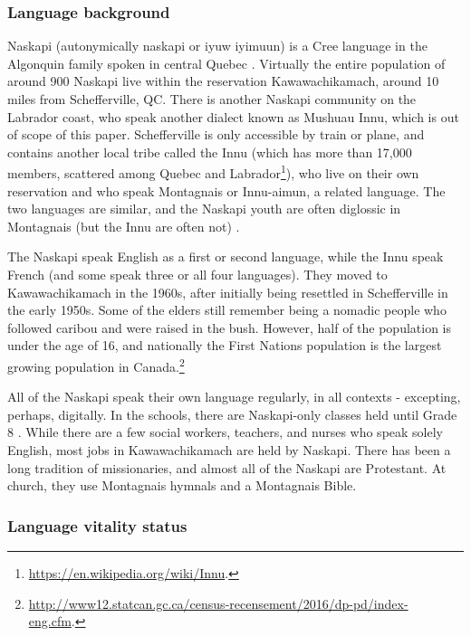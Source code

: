 \subsubsection{Language background}
\label{sec:naskapi-language-background}

Naskapi (autonymically  naskapi or  iyuw iyimuun) is a Cree language in the Algonquin family spoken in central Quebec \citep{MacKenzie-and-Jancewicz-1994}. Virtually the entire population of around 900 Naskapi live within the reservation Kawawachikamach, around 10 miles from Schefferville, QC. There is another Naskapi community on the Labrador coast, who speak another dialect known as Mushuau Innu, which is out of scope of this paper. Schefferville is only accessible by train or plane, and contains another local tribe called the Innu (which has more than 17,000 members, scattered among Quebec and Labrador\footnote{\href{https://en.wikipedia.org/wiki/Innu}{https://en.wikipedia.org/wiki/Innu}. }), who live on their own reservation and who speak Montagnais or Innu-aimun, a related language. The two languages are similar, and the Naskapi youth are often diglossic in Montagnais (but the Innu are often not) \citep{macKenzie1980towards}.

The Naskapi speak English as a first or second language, while the Innu speak French (and some speak three or all four languages). They moved to Kawawachikamach in the 1960s, after initially being resettled in Schefferville in the early 1950s. Some of the elders still remember being a nomadic people who followed caribou and were raised in the bush. However, half of the population is under the age of 16, and nationally the First Nations population is the largest growing population in Canada.\footnote{\href{http://www12.statcan.gc.ca/census-recensement/2016/dp-pd/index-eng.cfm}{http://www12.statcan.gc.ca/census-recensement/2016/dp-pd/index-eng.cfm}. }

All of the Naskapi speak their own language regularly, in all contexts - excepting, perhaps, digitally. In the schools, there are Naskapi-only classes held until Grade 8 \citep{llewellyn2017oral}. While there are a few social workers, teachers, and nurses who speak solely English, most jobs in Kawawachikamach are held by Naskapi. There has been a long tradition of missionaries, and almost all of the Naskapi are Protestant. At church, they use Montagnais hymnals and a Montagnais Bible.

\subsubsection{Language vitality status}
\label{sec:naskapi-vitality-status}

